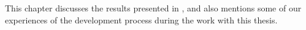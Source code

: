 This chapter discusses the results presented in , and
also mentions some of our experiences of the development process during
the work with this thesis.\\
